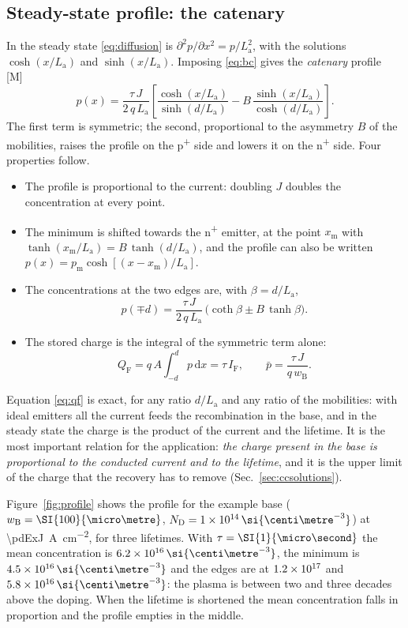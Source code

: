 \documentclass[10pt,a4paper]{scrartcl}
\newcommand{\IF}{I_\mathrm{F}}
\newcommand{\diff}{\mathrm{d}}
\newcommand{\ND}{N_\mathrm{D}}
\newcommand{\wB}{w_\mathrm{B}}
\newcommand{\La}{L_\mathrm{a}}
\newcommand{\QF}{Q_\mathrm{F}}
\newcommand{\Pp}{p\textsuperscript{+}}
\newcommand{\Np}{n\textsuperscript{+}}
\newcommand{\cmc}{\si{\centi\metre^{-3}}}
\begin{document}
\subsection{Steady-state profile: the catenary}
\label{sec:catenary}
In the steady state \eqref{eq:diffusion} is $\partial^2 p/\partial x^2 = p/\La^2$, with the solutions $\cosh(x/\La)$ and $\sinh(x/\La)$. Imposing \eqref{eq:bc} gives the \emph{catenary} profile [M]~\cite{hall1952,baliga}
\begin{equation}
p(x) = \frac{\tau\,J}{2\,q\,\La}\left[\frac{\cosh(x/\La)}{\sinh(d/\La)} - B\,\frac{\sinh(x/\La)}{\cosh(d/\La)}\right] .
\label{eq:catenary}
\end{equation}
The first term is symmetric; the second, proportional to the asymmetry $B$ of the mobilities, raises the profile on the \Pp{} side and lowers it on the \Np{} side. Four properties follow.
\begin{itemize}
\item The profile is proportional to the current: doubling $J$ doubles the concentration at every point.
\item The minimum is shifted towards the \Np{} emitter, at the point $x_\mathrm{m}$ with $\tanh(x_\mathrm{m}/\La) = B\,\tanh(d/\La)$, and the profile can also be written $p(x) = p_\mathrm{m}\cosh[(x - x_\mathrm{m})/\La]$.
\item The concentrations at the two edges are, with $\beta = d/\La$,
\begin{equation}
p(\mp d) = \frac{\tau\,J}{2\,q\,\La}\,\bigl(\coth\beta \pm B\,\tanh\beta\bigr) .
\label{eq:edges}
\end{equation}
\item The stored charge is the integral of the symmetric term alone:
\begin{equation}
\QF = q\,A\int_{-d}^{d} p\,\diff x = \tau\,\IF , \qquad \bar p = \frac{\tau\,J}{q\,\wB} .
\label{eq:qf}
\end{equation}
\end{itemize}
Equation \eqref{eq:qf} is exact, for any ratio $d/\La$ and any ratio of the mobilities: with ideal emitters all the current feeds the recombination in the base, and in the steady state the charge is the product of the current and the lifetime. It is the most important relation for the application: \emph{the charge present in the base is proportional to the conducted current and to the lifetime}, and it is the upper limit of the charge that the recovery has to remove (Sec.~\ref{sec:ccsolutions}).

Figure~\ref{fig:profile} shows the profile for the example base ($\wB = \SI{\pdExW}{\micro\metre}$, $\ND = \pdExNd\,\cmc$) at \SI{\pdExJ}{\ampere\per\centi\metre\squared}, for three lifetimes. With $\tau = \SI{\pdExMidTau}{\micro\second}$ the mean concentration is $\pdExMidPbar\,\cmc$, the minimum is $\pdExMidPmin\,\cmc$ and the edges are at $1.2\times10^{17}$ and $\pdExMidPr\,\cmc$: the plasma is between two and three decades above the doping. When the lifetime is shortened the mean concentration falls in proportion and the profile empties in the middle.
\end{document}
